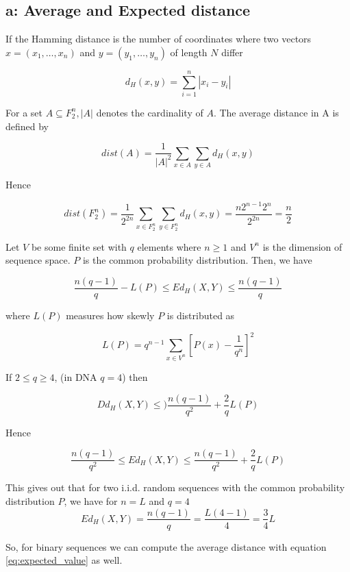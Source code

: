 \subsection{a: Average and Expected distance}

If the Hamming distance is the number of coordinates where two vectors $x = (x_1,\dots,x_n) $ and $y = (y_1, \dots, y_n)$ of length $N$ differ

\[  d_H(x,y) = \sum\limits_{i=1}^{n} | x_i -y_i |\]

For a set $A \subseteq  F^{n}_{2}, |A|$ denotes the cardinality of $A$. The average distance in A is defined by 

\begin{equation}
dist(A) = \frac{1}{|A|^2}\sum\limits_{x\in A}\sum\limits_{y\in A} d_H(x,y)
\end{equation}

Hence 

\begin{equation}
dist(F^{n}_{2}) = \frac{1}{2^{2n}}\sum\limits_{x\in F^{n}_{2}}\sum\limits_{y\in F^{n}_{2}} d_H(x,y) = \frac{n2^{n-1}2^n}{2^{2n}} = \frac{n}{2}
\end{equation}

Let $V$ be some finite set with $q$ elements where $n \geq 1$ and $V^n$ is the dimension of sequence space.  $P$ is the common probability distribution. Then, we have

\[  \frac{n(q-1)}{q} - L(P) \leq Ed_H(X,Y) \leq \frac{n(q-1)}{q} \]

where $L(P)$ measures how skewly $P$ is distributed as

\[  L(P) = q^{n-1} \sum\limits_{x \in V^n} \left[P(x)-\frac{1}{q^n}\right]^2 \]

If $ 2\leq q \geq 4$, (in DNA $q=4$) then 

\[  Dd_H(X,Y) \leq )\frac{n(q-1)}{q^2} + \frac{2}{q}L(P) \]

Hence

\[  \frac{n(q-1)}{q^2}  \leq Ed_H(X,Y) \leq \frac{n(q-1)}{q^2} + \frac{2}{q}L(P) \]

This gives out that for two i.i.d. random sequences with the common probability distribution $P$, we have for  $n = L$ and $q = 4$
\begin{equation}
Ed_H(X,Y)  = \frac{n(q-1)}{q} = \frac{L(4-1)}{4} = \frac{3}{4}L
\label{eq:expected_value}
\end{equation}

So, for binary sequences we can compute the average distance with equation \ref{eq:expected_value} as well.

